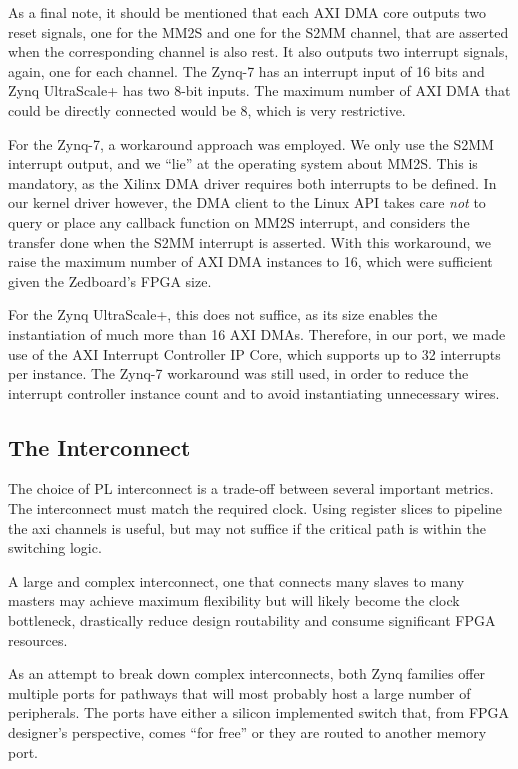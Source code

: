 As a final note, it should be mentioned that each AXI DMA core outputs two reset signals,
one for the MM2S and one for the S2MM channel, that are asserted when the corresponding channel is also rest.
It also outputs two interrupt signals, again, one for each channel.
The Zynq-7 has an interrupt input of 16 bits and Zynq UltraScale+ has two 8-bit inputs.
The maximum number of AXI DMA that could be directly connected would be 8, which is very restrictive.

For the Zynq-7, a workaround approach was employed. We only use the S2MM interrupt output,
and we ``lie'' at the operating system about MM2S. This is mandatory, as the Xilinx DMA driver requires
both interrupts to be defined. In our kernel driver however, the DMA client to the Linux API takes
care \emph{not} to query or place any callback function on MM2S interrupt, and considers the transfer done
when the S2MM interrupt is asserted. With this workaround, we raise the maximum number of AXI DMA instances
to 16, which were sufficient given the Zedboard's FPGA size.

For the Zynq UltraScale+, this does not suffice, as its size enables the instantiation of much more than 16
AXI DMAs. Therefore, in our port, we made use of the AXI Interrupt Controller IP Core, which supports up
to 32 interrupts per instance. The Zynq-7 workaround was still used, in order to reduce the interrupt
controller instance count and to avoid instantiating unnecessary wires.

\subsection{The Interconnect}

The choice of PL interconnect is a trade-off between several important metrics.
The interconnect must match the required clock.
Using register slices to pipeline the \gls{axi} channels is useful,
but may not suffice if the critical path is within the switching logic.

A large and complex interconnect, one that connects many slaves to many masters
may achieve maximum flexibility but will likely become the clock bottleneck,
drastically reduce design routability and consume significant FPGA resources.

As an attempt to break down complex interconnects, both Zynq families
offer multiple ports for pathways that will most
probably host a large number of peripherals.
The ports have either a silicon implemented switch that,
from FPGA designer's perspective, comes ``for free'' or they are routed to
another memory port.

